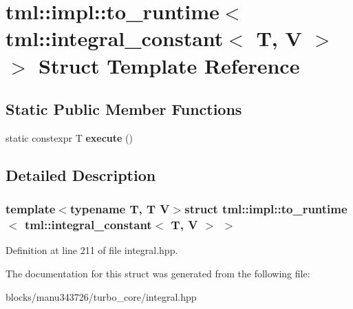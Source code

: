 \hypertarget{structtml_1_1impl_1_1to__runtime_3_01tml_1_1integral__constant_3_01_t_00_01_v_01_4_01_4}{\section{tml\+:\+:impl\+:\+:to\+\_\+runtime$<$ tml\+:\+:integral\+\_\+constant$<$ T, V $>$ $>$ Struct Template Reference}
\label{structtml_1_1impl_1_1to__runtime_3_01tml_1_1integral__constant_3_01_t_00_01_v_01_4_01_4}
}
\subsection*{Static Public Member Functions}
\begin{DoxyCompactItemize}
\item 
\hypertarget{structtml_1_1impl_1_1to__runtime_3_01tml_1_1integral__constant_3_01_t_00_01_v_01_4_01_4_afe3bf341c476a42f4a31f87da486bb54}{static constexpr T {\bfseries execute} ()}\label{structtml_1_1impl_1_1to__runtime_3_01tml_1_1integral__constant_3_01_t_00_01_v_01_4_01_4_afe3bf341c476a42f4a31f87da486bb54}

\end{DoxyCompactItemize}


\subsection{Detailed Description}
\subsubsection*{template$<$typename T, T V$>$struct tml\+::impl\+::to\+\_\+runtime$<$ tml\+::integral\+\_\+constant$<$ T, V $>$ $>$}



Definition at line 211 of file integral.\+hpp.



The documentation for this struct was generated from the following file\+:\begin{DoxyCompactItemize}
\item 
blocks/manu343726/turbo\+\_\+core/integral.\+hpp\end{DoxyCompactItemize}
